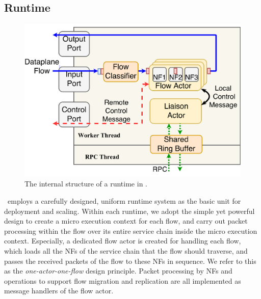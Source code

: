 
\subsection{Runtime}
\label{sec:runtime}

\begin{figure}
		\centering
		\includegraphics[width=\columnwidth]{figure/new-nfactor-runtime-arch.pdf}

		\caption{The internal structure of a runtime in \nfactor.}
\label{fig:runtime-arch}
\end{figure}

\nfactor~employs a carefully designed, uniform runtime system as the basic unit for deployment and scaling. %
  Within each runtime, we adopt the simple yet powerful design to create a micro execution context for each flow, and carry out %
  packet processing within the flow over its entire service chain inside the micro execution context. Especially, a dedicated flow actor is created for handling each flow, which loads all the NFs of the service chain that the flow should traverse, and passes the received packets of the flow to these NFs in sequence. We refer to this as the {\em one-actor-one-flow} design principle. Packet processing by NFs and operations to support flow migration and replication are all implemented as message handlers of the flow actor. 


